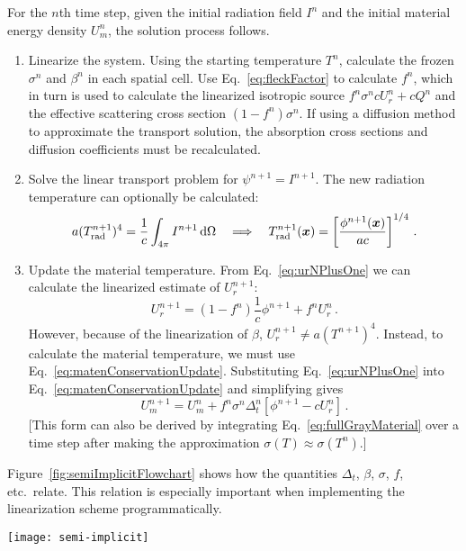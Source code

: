 For the $n$th time step, given the initial radiation field $I^{n}$ and the
initial material energy density $U_m^n$, the solution process follows.
\begin{enumerate}
  \item Linearize the system. Using the starting temperature $T^n$, calculate
    the frozen $\sigma^n$ and $\beta^n$ in each spatial cell. Use
    Eq.~\eqref{eq:fleckFactor} to calculate $f^n$, which in turn is used to
    calculate the linearized isotropic source $f^n \sigma^n c U_r^n + c Q^n$
    and the effective scattering cross section $\left(1 - f^n\right) \sigma^n$.
    If using a diffusion method to approximate the transport solution, the
    absorption cross sections and diffusion coefficients must be recalculated.
  \item Solve the linear transport problem for $\psi^{n+1}=I^{n+1}$. The new
    radiation
    temperature can optionally be calculated:
    \begin{equation*}
      a (T_\text{rad}^{n+1})^4 = \frac{1}{c} \int_{4\pi} I^{n+1}
      \mathop{}\!\mathrm{d} \Omega
      \quad \Longrightarrow \quad
      T_\text{rad}^{n+1}(\bm{x}) = \left[ \frac{\phi^{n+1}(\bm{x})}{ac} \right]^{1/4}\,.
    \end{equation*}
  \item Update the material temperature. From Eq.~\eqref{eq:urNPlusOne}
    we can calculate the linearized estimate of $U_r^{n+1}$:
    \begin{equation*}
      U_r^{n+1} = \left(1 - f^n\right) \frac1c \phi^{n+1}  + f^n U_r^n\,.
    \end{equation*}
    However, because of the linearization of $\beta$, $U_r^{n+1} \ne a
    (T^{n+1})^4$. Instead, to calculate the material temperature, we must use
    Eq.~\eqref{eq:matenConservationUpdate}. Substituting
    Eq.~\eqref{eq:urNPlusOne} into Eq.~\eqref{eq:matenConservationUpdate}
    and simplifying gives
    \begin{equation}\label{eq:matenConservationUpdate2}
      U_m^{n+1} =  U_m^n + f^n \sigma^n \Delta_t^n \left[ \phi^{n+1} - c U_r^n \right] \,.
    \end{equation}
    [This form can also be derived by integrating
    Eq.~\eqref{eq:fullGrayMaterial} over a time step after making the
    approximation $\sigma(T) \approx \sigma(T^n)$.]
\end{enumerate}

Figure~\ref{fig:semiImplicitFlowchart} shows how the quantities $\Delta_t$,
$\beta$, $\sigma$, $f$, etc.~relate. This relation is especially important when
implementing the linearization scheme programmatically. 
\begin{sidewaysfigure}[hp]
  \centering
  \texttt{[image: semi-implicit]}
  \caption{Dependency graph of quantities in the semi-implicit discretization.}
  \label{fig:semiImplicitFlowchart}
\end{sidewaysfigure}


